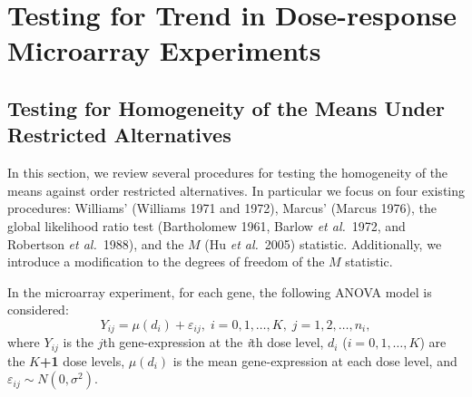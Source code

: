 \chapter{Testing for Trend in Dose-response Microarray Experiments}
 \label{chap: testfortrend}

\section{Testing for Homogeneity of the Means Under Restricted
Alternatives} \label{sec: testing}

In this section, we review several procedures for testing the
homogeneity of the means against order restricted alternatives. In
particular we focus on four existing procedures: Williams' (Williams
1971 and 1972), Marcus' (Marcus 1976), the global likelihood ratio
test (Bartholomew 1961, Barlow \textit{et al.}\ 1972, and Robertson
\textit{et al.}\ 1988), and the $M$ (Hu \textit{et al.}\ 2005)
statistic. Additionally, we introduce a modification to the degrees
of freedom of the $M$ statistic.

In the microarray experiment, for each gene, the following ANOVA
model is considered:
\begin{equation}
\label{themodel} Y_{ij}=\mu(d_{i})+\varepsilon_{ij},\;i=0,1,\dots,
K,\;j=1,2, \dots, n_i,
\end{equation}
where $Y_{ij}$ is the $j$th gene-expression at the \textit{i}th dose
level, $d_{i}$ ($i=0,1,\dots, K$) are the \textbf{$K$+1} dose
levels, $\mu(d_{i})$ is the mean gene-expression at each dose level,
and $\varepsilon_{ij} \sim N(0,\sigma^{2})$.

